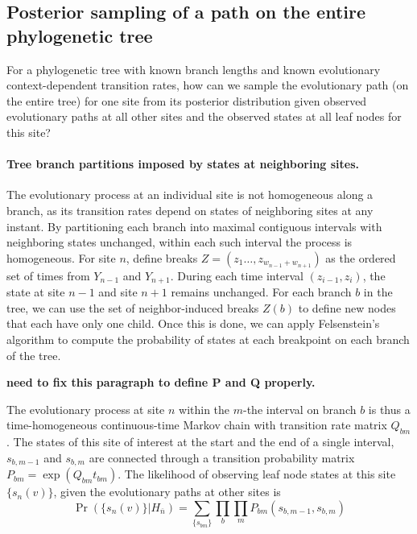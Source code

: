 \documentclass[11pt]{article}
\begin{document}
\subsection{Posterior sampling of a path on the entire phylogenetic tree}

For a phylogenetic tree with known branch lengths and known
evolutionary context-dependent transition rates, how can we sample the
evolutionary path (on the entire tree) for one site from its posterior
distribution given observed evolutionary paths at all other sites and the
observed states at all leaf nodes for this site?

\paragraph{Tree branch partitions imposed by states at neighboring sites.}
The evolutionary process at an individual site is not homogeneous along a branch, as
its transition rates depend on states of neighboring sites at any
instant. By partitioning each branch into maximal contiguous intervals
with neighboring states unchanged, within each such interval the
process is homogeneous. For site $n$, define breaks $Z =
(z_1\ldots,z_{w_{n-1} + w_{n+1}})$ as the ordered set of times from
$Y_{n-1}$ and $Y_{n+1}$. During each time interval $(z_{i-1}, z_{i})$,
the state at site $n-1$ and site $n+1$ remains unchanged.  For each
branch $b$ in the tree, we can use the set of neighbor-induced breaks
$Z(b)$ to define new nodes that each have only one child. Once this is
done, we can apply Felsenstein's algorithm to compute the probability
of states at each breakpoint on each branch of the tree.

{\bf need to fix this paragraph to define P and Q properly.}

The evolutionary process at site $n$ within the $m$-the interval on
branch $b$ is thus a time-homogeneous continuous-time Markov chain
with transition rate matrix $Q_{bm}$.  The states of this site of
interest at the start and the end of a single interval, $s_{b,m-1}$
and $s_{b,m}$ are connected through a transition probability matrix
$P_{bm} = \exp(Q_{bm}t_{bm})$.  The likelihood of observing leaf node
states at this site $\{s_n(v)\}$, given the evolutionary paths at
other sites is
\[
\Pr(\{s_n(v)\} | H_{\overline{n}}) = \sum_{\{s_{bm}\}} \prod_{b} \prod_{m} P_{bm}(s_{b,m-1}, s_{b, m})
\]

\end{document}
